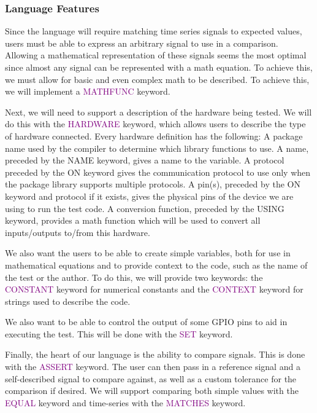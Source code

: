 \documentclass[sigconf,authordraft]{acmart}
\begin{document}
\subsubsection{Language Features}
Since the language will require matching time series signals to expected values, users must be able to express an arbitrary signal to use in a comparison. Allowing a mathematical representation of these signals seems the most optimal since almost any signal can be represented with a math equation. To achieve this, we must allow for basic and even complex math to be described. To achieve this, we will implement a \textcolor{purple}{MATHFUNC} keyword.

Next, we will need to support a description of the hardware being tested. We will do this with the \textcolor{purple}{HARDWARE} keyword, which allows users to describe the type of hardware connected. Every hardware definition has the following: A package name used by the compiler to determine which library functions to use. A name, preceded by the NAME keyword, gives a name to the variable. A protocol preceded by the ON keyword gives the communication protocol to use only when the package library supports multiple protocols. A pin(s), preceded by the ON keyword and protocol if it exists, gives the physical pins of the device we are using to run the test code. A conversion function, preceded by the USING keyword, provides a math function which will be used to convert all inputs/outputs to/from this hardware.

We also want the users to be able to create simple variables, both for use in mathematical equations and to provide context to the code, such as the name of the test or the author. To do this, we will provide two keywords: the \textcolor{purple}{CONSTANT} keyword for numerical constants and the \textcolor{purple}{CONTEXT} keyword for strings used to describe the code.

We also want to be able to control the output of some GPIO pins to aid in executing the test. This will be done with the \textcolor{purple}{SET} keyword.

Finally, the heart of our language is the ability to compare signals. This is done with the \textcolor{purple}{ASSERT} keyword. The user can then pass in a reference signal and a self-described signal to compare against, as well as a custom tolerance for the comparison if desired. We will support comparing both simple values with the \textcolor{purple}{EQUAL} keyword and time-series with the \textcolor{purple}{MATCHES} keyword.
\end{document}
